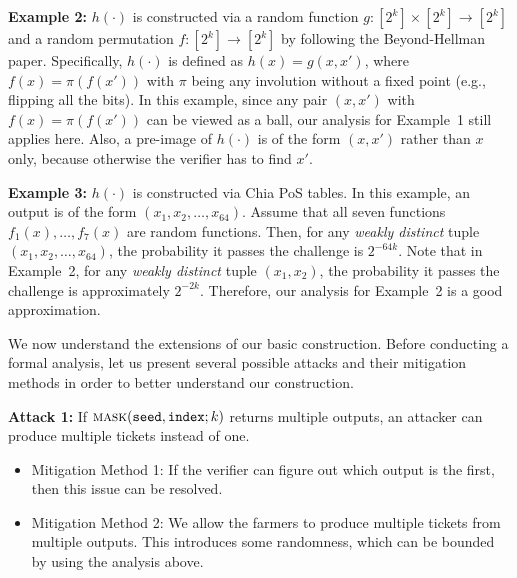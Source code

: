 \documentclass[12pt,draftcls,onecolumn]{IEEEtran}
\newcommand{\seed}{\texttt{seed}}
\newcommand{\ind}{\texttt{index}}
\newcommand{\mask}{\textsc{mask}}
\begin{document}


{\bf Example 2:} $h(\cdot)$ is constructed via a random function $g : [2^k] \times [2^k] \to [2^k]$
and a random permutation $f: [2^k] \to [2^k]$ by following the Beyond-Hellman paper. Specifically, 
$h(\cdot)$ is defined as $h(x) = g(x, x')$, where $f(x) = \pi( f(x') )$ with $\pi$ being any involution
without a fixed point (e.g., flipping all the bits). In this example, since any pair $(x, x')$ with $f(x) = \pi( f(x') )$ can be viewed as a ball, our analysis for Example~1 still applies here. Also, a pre-image of $h(\cdot)$ is of the form $(x, x')$ rather than $x$ only, because otherwise the verifier has to find $x'$.

{\bf Example 3:} $h(\cdot)$ is constructed via Chia PoS tables. In this example, an output is of the form $(x_1, x_2, \ldots, x_{64})$. Assume that all seven functions $f_1(x), \ldots, f_7(x)$  are random functions.
Then, for any \emph{weakly distinct} tuple $(x_1, x_2, \ldots, x_{64})$, the probability it passes the challenge is $2^{-64k}$.
Note that in Example~2, for any \emph{weakly distinct} tuple $(x_1, x_2)$, the probability it passes the challenge is approximately $2^{-2k}$. Therefore, our analysis for Example~2 is a good approximation.


We now understand the extensions of our basic construction. Before conducting a formal analysis, let us present several possible attacks and their mitigation methods in order to better understand our construction.

{\bf Attack 1:} If $\mask(\seed, \ind; k)$ returns multiple outputs, an attacker can produce multiple tickets instead of one.

\begin{itemize}
    \item Mitigation Method 1: If the verifier can figure out which output is the first, then this issue can be resolved.
    \item Mitigation Method 2: We allow the farmers to produce multiple tickets from multiple outputs. This introduces some randomness, which can be bounded by using the analysis above.
\end{itemize}
\end{document}
